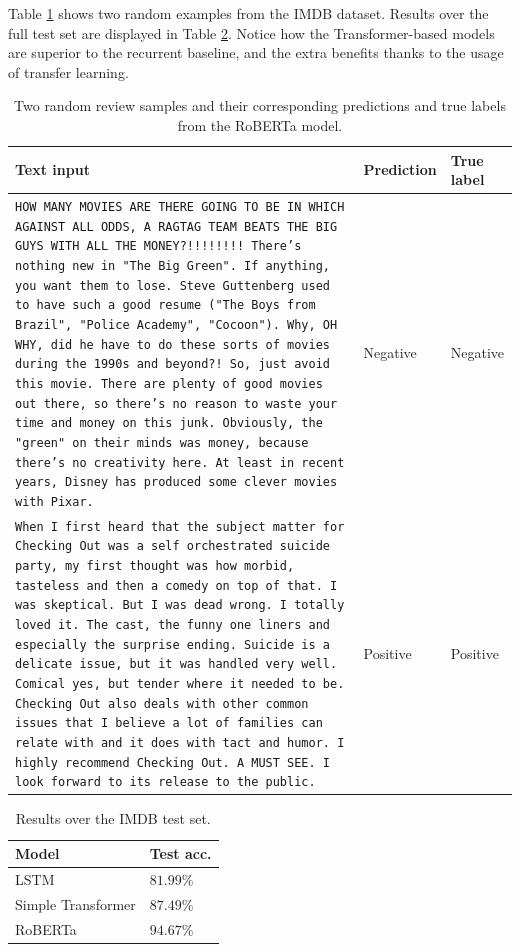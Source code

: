 Table \ref{tab:examples} shows two random examples from the IMDB dataset.
Results over the full test set are displayed in Table \ref{tab:nlp}. Notice how the Transformer-based models are superior to the recurrent baseline, and the extra benefits thanks to the usage of transfer learning.

{\footnotesize
\begin{table}[ht]
\caption{Two random review samples and their corresponding predictions and true labels from the RoBERTa model.}
\centering
\begin{tabularx}{\textwidth}{Xll}
Text input & Prediction & True label \\
\hline
 {\scriptsize \texttt{HOW MANY MOVIES ARE THERE GOING TO BE IN WHICH
AGAINST ALL ODDS, A RAGTAG TEAM BEATS THE BIG GUYS
WITH ALL THE MONEY?!!!!!!!! There's nothing new in
"The Big Green". If anything, you want them to
lose. Steve Guttenberg used to have such a good
resume ("The Boys from Brazil", "Police Academy",
"Cocoon"). Why, OH WHY, did he have to do these
sorts of movies during the 1990s and beyond?! So,
just avoid this movie. There are plenty of good
movies out there, so there's no reason to waste
your time and money on this junk. Obviously, the
"green" on their minds was money, because there's
no creativity here. At least in recent years,
Disney has produced some clever movies with Pixar.} } &   Negative & Negative   \\
\hline
 {\scriptsize \texttt{When I first heard that the subject matter for
Checking Out was a self orchestrated suicide
party, my first thought was how morbid, tasteless
and then a comedy on top of that. I was skeptical.
But I was dead wrong. I totally loved it. The
cast, the funny one liners and especially the
surprise ending. Suicide is a delicate issue, but
it was handled very well. Comical yes, but tender
where it needed to be. Checking Out also deals
with other common issues that I believe a lot of
families can relate with and it does with tact and
humor. I highly recommend Checking Out. A MUST
SEE. I look forward to its release to the public.} } &   Positive & Positive   \\

\end{tabularx}
\label{tab:examples}
\end{table}
}

\begin{table}[h]
\caption{Results over the IMDB test set.}
\centering
\begin{tabular}{ll}
Model & Test acc. \\
\hline
LSTM &  $81.99\%$ \\
Simple Transformer &  $87.49\%$ \\
RoBERTa &  $94.67\%$\\
\end{tabular}
\label{tab:nlp}
\end{table}











